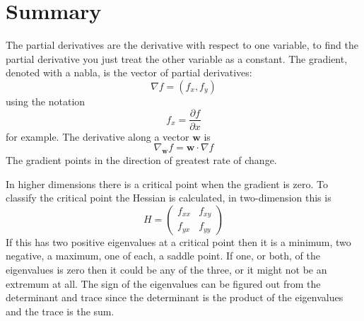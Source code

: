 \documentclass[12pt]{article}
\begin{document}
\section*{Summary}

The partial derivatives are the derivative with respect to one
variable, to find the partial derivative you just treat the other
variable as a constant. The gradient, denoted with a nabla, is the
vector of partial derivatives:
\begin{equation}
  \nabla f=(f_x,f_y)
\end{equation}
using the notation
\begin{equation}
  f_x=\frac{\partial f}{\partial x}
\end{equation}
for example. The derivative along a vector $\mathbf{w}$ is
\begin{equation}
  \nabla_{\mathbf{w}}f=\mathbf{w}\cdot \nabla f
\end{equation}
The gradient points in the direction of greatest rate of change.

In higher dimensions there is a critical point when the gradient is zero. To classify the critical point the Hessian is calculated, in two-dimension this is
  \begin{equation}
  H=\left(\begin{array}{cc}f_{xx}&f_{xy}\\f_{yx}&f_{yy}\end{array}\right)
\end{equation}
If this has two positive eigenvalues at a critical point then it is a
minimum, two negative, a maximum, one of each, a saddle point. If one,
or both, of the eigenvalues is zero then it could be any of the three,
or it might not be an extremum at all. The sign of the eigenvalues can
be figured out from the determinant and trace since the determinant is
the product of the eigenvalues and the trace is the sum.
\end{document}
